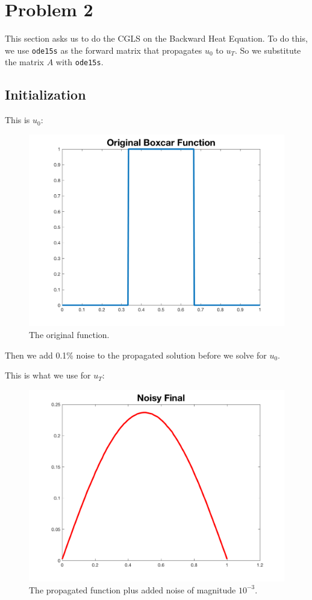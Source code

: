 \documentclass{article}
\begin{document}
\section{Problem 2}

This section asks us to do the CGLS on the Backward Heat Equation. To do this, we use \texttt{ode15s} as the forward matrix that propagates $u_{0}$ to $u_{T}$. So we substitute the matrix $A$ with \texttt{ode15s}.

\subsection{Initialization}

This is $u_{0}$:

\begin{figure}[H]
    \centerline{
    \includegraphics[height = 5 cm]{boxcar.png}
    }
    \caption{\label{fig:boxcar} The original function.}
\end{figure}

Then we add 0.1\% noise to the propagated solution before we solve for $u_{0}$.

This is what we use for $u_{T}$:

\begin{figure}[H]
    \centerline{
    \includegraphics[height = 6 cm]{noisyfinal.png}
    }
    \caption{\label{fig:noisyfinal} The propagated function plus added noise of magnitude $10^{-3}$.}
\end{figure}
\end{document}
